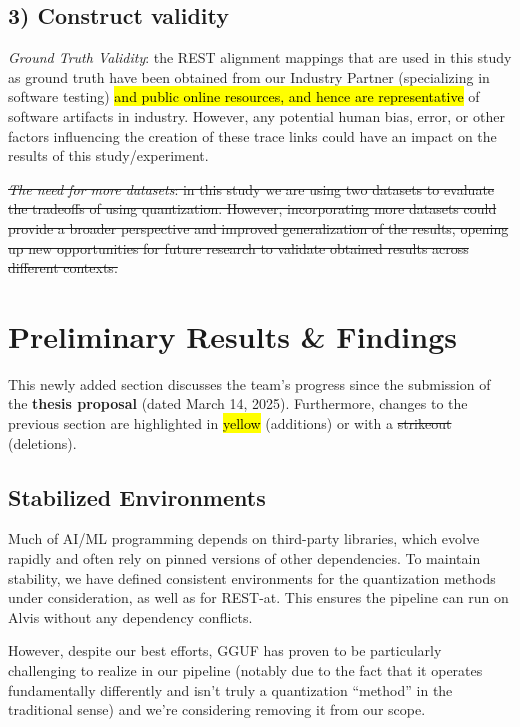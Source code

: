 \documentclass[conference]{IEEEtran}
\newcommand{\hly}[1]{\sethlcolor{yellow}\hl{#1}}
\begin{document}
\subsection*{\textbf{3) Construct validity}}

\textit{Ground Truth Validity}: the REST alignment mappings that are used in this study as ground truth have been obtained from our Industry Partner (specializing in software testing) \hly{and public online resources, and hence are representative} of software artifacts in industry. However, any potential human bias, error, or other factors influencing the creation of these trace links could have an impact on the results of this study/experiment.

\st{\textit{The need for more datasets}: in this study we are using two datasets to evaluate the tradeoffs of using quantization. However, incorporating more datasets could provide a broader perspective and improved generalization of the results, opening up new opportunities for future research to validate obtained results across different contexts.}

\section{Preliminary Results \& Findings}

This newly added section discusses the team's progress since the submission of the \textbf{thesis proposal} (dated March 14, 2025). Furthermore, changes to the previous section are highlighted in \hly{yellow} (additions) or with a \st{strikeout} (deletions).

\subsection{Stabilized Environments}

Much of AI/ML programming depends on third-party libraries, which evolve rapidly and often rely on pinned versions of other dependencies. To maintain stability, we have defined consistent environments for the quantization methods under consideration, as well as for REST-at. This ensures the pipeline can run on Alvis without any dependency conflicts. 

However, despite our best efforts, GGUF has proven to be particularly challenging to realize in our pipeline (notably due to the fact that it operates fundamentally differently and isn’t truly a quantization ``method'' in the traditional sense) and we're considering removing it from our scope.
\end{document}
